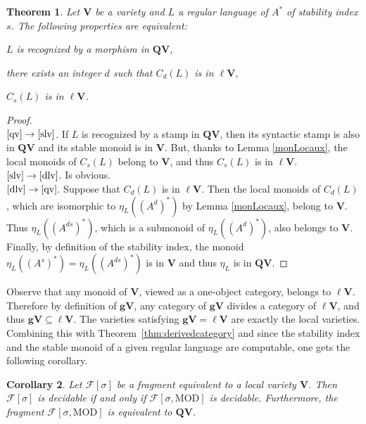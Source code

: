 \documentclass[submission,hidelink]{dmtcs-episciences}
\newtheorem{theorem}{Theorem}
\newtheorem{corollary}[theorem]{Corollary}
\newcommand{\QV}{\mathbf{QV}}
\newcommand{\V}{\mathbf{V}}
\newcommand{\gV}{\mathbf{gV}}
\newcommand{\cF}{\mathcal{F}}
\newcommand{\MOD}{\mathrm{MOD}}
\newenvironment{conditions}
{\begin{list}{\rm (\theenumi)}{\noindent \usecounter{enumi}\setlength{\topsep}{2pt}\setlength{\partopsep}{0pt}\setlength{\itemsep}{2pt}\setlength{\parsep}{0pt}\setlength{\leftmargin}{2.5em}\setlength{\labelwidth}{1.5em}\setlength{\labelsep}{0.5em}\setlength{\listparindent}{0pt}\setlength{\itemindent}{0pt}}}{\end{list}}
\begin{document}
	\begin{theorem}\label{QVlV}
	Let $\V$ be a variety and $L$ a regular language of $A^*$ of
	stability index $s$. The following properties are equivalent:
	\begin{conditions}
	\item\label{qv} $L$ is recognized by a morphism in $\QV$,
	\item\label{dlv} there exists an integer $d$ such that $C_d(L)$ is in $\ell\V$,
	\item\label{slv} $C_s(L)$ is in $\ell\V$.
	\end{conditions}
	\end{theorem}
	\begin{proof}
$\ $\\
	$\ref{qv}\to \ref{slv}$. If $L$ is recognized by a stamp in $\QV$, then its syntactic stamp is also in $\QV$
			and its stable monoid
			is in $\V$. But, thanks to Lemma \ref{monLocaux},
			the local monoids of $C_s(L)$  belong to $\V$, and thus $C_s(L)$ is in $\ell\V$.\\
	$\ref{slv}\to \ref{dlv}$. Is obvious.\\
	$\ref{dlv}\to \ref{qv}$. Suppose that $C_d(L)$ is in $\ell\V$.
			Then the local monoids of $C_d(L)$,
			which are isomorphic to $\eta_L((A^d)^*)$ by Lemma \ref{monLocaux}, belong to $\V$.
			Thus $\eta_L((A^{ds})^*)$, which is a submonoid of $\eta_L((A^d)^*)$, also
			belongs to $\V$. Finally, by definition of the stability index, the monoid
			$\eta_L((A^s)^*)=\eta_L((A^{ds})^*)$ is in $\V$ and thus
			$\eta_L$ is in $\QV$.
	\end{proof}

	Observe that any monoid of $\V$, viewed as a one-object category,
	belongs to $\ell\V$. Therefore by definition of $\gV$, any category of $\gV$
	divides a category of $\ell\V$, and thus $\gV\subseteq\ell\V$.
	The varieties satisfying $\gV=\ell\V$ are exactly the  local varieties.
	Combining this with Theorem~\ref{thm:derivedcategory} and
	 since the stability index and the stable monoid of
	 a given regular language are computable, one gets the following corollary.
	 \begin{corollary}
		Let $\cF[\sigma]$ be a fragment equivalent to a local variety $\V$. Then $\cF[\sigma]$ is
		decidable  if and only if $\cF[\sigma,\MOD]$ is decidable. Furthermore, the fragment $\cF[\sigma,\MOD]$ is
		equivalent to $\QV$.
	\end{corollary}
\end{document}
